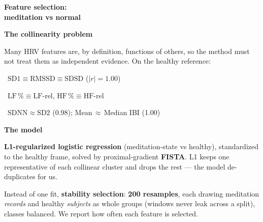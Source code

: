 \documentclass[fontsize=9pt]{scrartcl}
\newlength{\panelA}\setlength{\panelA}{97mm}
\begin{document}
\noindent%
\begin{minipage}[t][210mm][t]{\panelA}%
\begin{tcolorbox}[panel,colback=jcindigodk,width=\panelA,height=210mm,fontupper=\color{white}]
  \vspace{5mm}
  {\raggedright\color{white}\bfseries\fontsize{17}{21}\selectfont
   Feature selection:\\[0.5mm] meditation vs normal\par}
  \vspace{7mm}

  {\color{jclav}\bfseries\normalsize The collinearity problem\par}\vspace{2mm}
  {\raggedright\normalsize\color{white!90}
   Many HRV features are, by definition, functions of others, so the method must
   not treat them as independent evidence. On the healthy reference:\par}
  \vspace{1.6mm}
  {\raggedright\normalsize\color{white!90}
   \textbullet~$\mathrm{SD1}\equiv\mathrm{RMSSD}\equiv\mathrm{SDSD}$ ($|r|=1.00$)\par
   \vspace{1mm}
   \textbullet~$\mathrm{LF\,\%}\equiv\mathrm{LF\text{-}rel}$,\;
     $\mathrm{HF\,\%}\equiv\mathrm{HF\text{-}rel}$\par
   \vspace{1mm}
   \textbullet~$\mathrm{SDNN}\approx\mathrm{SD2}$ (0.98);\;
     Mean\,$\approx$\,Median IBI (1.00)\par}
  \vspace{7mm}

  {\color{jclav}\bfseries\normalsize The model\par}\vspace{2mm}
  {\raggedright\normalsize\color{white!90}
   \textbf{L1-regularized logistic regression} (meditation-state vs healthy),
   standardized to the healthy frame, solved by proximal-gradient \textbf{FISTA}.
   L1 keeps one representative of each collinear cluster and drops the rest --- the
   model de-duplicates for us.\par}
  \vspace{2.5mm}
  {\raggedright\normalsize\color{white!90}
   Instead of one fit, \textbf{stability selection}: \textbf{200 resamples}, each
   drawing meditation \emph{records} and healthy \emph{subjects} as whole groups
   (windows never leak across a split), classes balanced. We report how often each
   feature is selected.\par}
  \vspace{7mm}


\end{tcolorbox}
\end{minipage}
\end{document}
